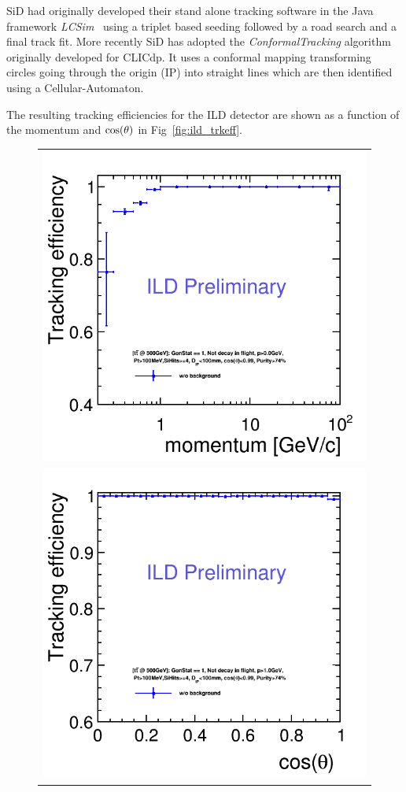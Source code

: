 SiD had originally developed their stand alone tracking software in the Java framework \emph{LCSim}~\cite{bib:LCSim}
using a triplet based seeding followed by a road search and a final track fit. More recently SiD has adopted the \emph{ConformalTracking}
algorithm originally developed for CLICdp. It uses a conformal mapping transforming circles going through the origin (IP)
into straight lines which are then identified using a Cellular-Automaton.



The resulting tracking efficiencies for the ILD detector are shown as a function of the momentum and
$\rm{cos}(\theta)$ in Fig~\ref{fig:ild_trkeff}.

\begin{figure}
  \begin{tabular}[c]{c}
    \includegraphics[width=0.85\hsize]{chapters/figures/trkEff_Momentum_ttbar_ILD_l5_v02_v02-00-02_New_publish_cuts2.png} \\
    \includegraphics[width=0.85\hsize]{chapters/figures/trkEff_theta_ttbar_ILD_l5_v02_v02-00-02_New_publish_cuts1.png}

\end{tabular}
\end{figure}
